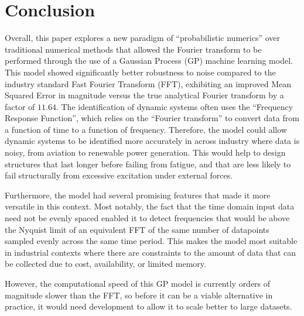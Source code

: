 \documentclass[12pt]{article}
\begin{document}

    \section{Conclusion}
    Overall, this paper explores a new paradigm of ``probabilistic numerics'' over traditional numerical methods that allowed the Fourier transform to be performed through the use of a Gaussian Process (GP) machine learning model.
    This model showed significantly better robustness to noise compared to the industry standard Fast Fourier Transform (FFT), exhibiting an improved Mean Squared Error in magnitude versus the true analytical Fourier transform by a factor of $11.64$.
    The identification of dynamic systems often uses the ``Frequency Response Function'', which relies on the ``Fourier transform'' to convert data from a function of time to a function of frequency.
    Therefore, the model could allow dynamic systems to be identified more accurately in across industry where data is noisy, from aviation to renewable power generation.
    This would help to design structures that last longer before failing from fatigue, and that are less likely to fail structurally from excessive excitation under external forces.

    Furthermore, the model had several promising features that made it more versatile in this context.
    Most notably, the fact that the time domain input data need not be evenly spaced enabled it to detect frequencies that would be above the Nyquist limit of an equivalent FFT of the same number of datapoints sampled evenly across the same time period.
    This makes the model most suitable in industrial contexts where there are constraints to the amount of data that can be collected due to cost, availability, or limited memory.

    However, the computational speed of this GP model is currently orders of magnitude slower than the FFT, so before it can be a viable alternative in practice, it would need development to allow it to scale better to large datasets.

    \FloatBarrier

    \newpage
    \printbibliography
    \newpage
    
\end{document}
